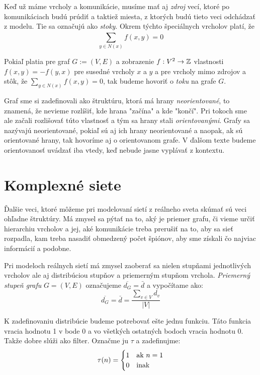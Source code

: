 Keď už máme vrcholy a komunikácie, musíme mať aj \emph{zdroj} vecí, ktoré po 
komunikáciach budú prúdiť a taktiež miesta, z ktorých budú tieto veci odchádzať 
z modelu. Tie sa označujú ako \emph{stoky}. Okrem týchto špeciálnych vrcholov 
platí, že $$\sum_{y\in N(x)}^{}{f(x,y) = 0}$$

Pokiaľ platia pre graf $G := (V, E)$ a zobrazenie $f:V^2\rightarrow\mathbb{Z}$ 
vlastnosti $f(x,y) = -f(y,x)$ pre susedné vrcholy $x$ a $y$ a pre vrcholy mimo 
zdrojov a stôk, že $\sum_{y\in N(x)}^{}{f(x,y) = 0}$, tak budeme hovoriť o 
\emph{toku} na grafe $G$.

Graf sme si zadefinovali ako štruktúru, ktorá má hrany \emph{neorientované}, 
to znamená, že nevieme rozlíšiť, kde hrana "začína" a kde "končí". Pri tokoch 
sme ale začali rozlišovať túto vlastnosť a tým sa hrany stali 
\emph{orientovanými}. Grafy sa nazývajú neorientované, pokiaľ sú aj ich hrany 
neorientované a naopak, ak sú orientované hrany, tak hovoríme aj o 
orientovanom grafe. V ďalšom texte budeme orientovanosť uvádzať iba vtedy, keď 
nebude jasne vyplávať z kontextu.

\section{Komplexné siete}

Ďalšie veci, ktoré môžeme pri modelovaní sietí z reálneho sveta skúmať sú 
veci ohľadne štruktúry. Má zmysel sa pýtať na to, aký je priemer grafu, či vieme 
určiť hierarchiu vrcholov a jej, aké komunikácie treba prerušiť na to, aby 
sa sieť rozpadla, kam treba nasadiť obmedzený počet špiónov, aby sme získali čo 
najviac informácií a podobne.

Pri modeloch reálnych sietí má zmysel zaoberať sa nielen stupňami jednotlivých 
vrcholov ale aj distribúciou stupňov a priemerným stupňom vrchola. 
\emph{Priemerný stupeň grafu} $G = (V, E)$ označujeme $\overline{d_G} = \bar{d}$ a 
vypočítame ako: $$\overline{d_G} = \bar{d} = \frac{\sum_{v \in V}^{}{d_v}}{|V|}$$

K zadefinovaniu distribúcie budeme potrebovať ešte jednu funkciu. Táto funkcia 
vracia hodnotu 1 v bode 0 a vo všetkých ostatných bodoch vracia hodnotu 0. 
Takže dobre slúži ako filter. Označme ju $\tau$ a zadefinujme: 
$$\tau (n) = \begin{cases}
\hfill 1 \hfill & \text{ak $n=1$} \\
\hfill 0 \hfill & \text{inak} \\
\end{cases}$$


